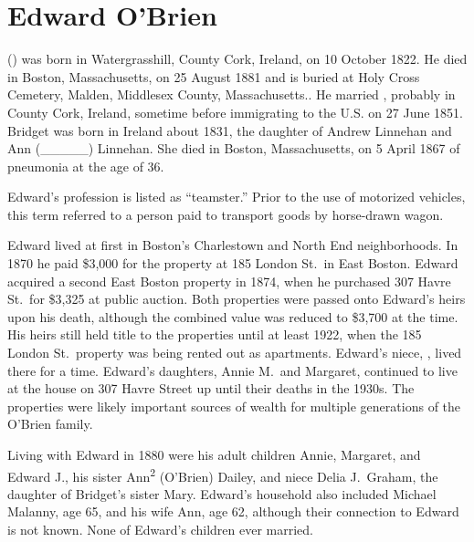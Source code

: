 \section{Edward O'Brien}

 () was born in Watergrasshill, County Cork, Ireland, on 10 October 1822.\cite{Edward2OBrienNaturalization} He died in Boston, Massachusetts, on 25 August 1881\cite{Edward2OBrienDeath} and is buried at Holy Cross Cemetery, Malden, Middlesex County, Massachusetts.\cite{CarolGordon}. He married ,\cite{Edward2OBrienMarriage} probably in County Cork, Ireland, sometime before immigrating to the U.S. on 27 June 1851.\cite{Edward2OBrienNaturalization,Edward2OBrienPetition} Bridget was born in Ireland about 1831, the daughter of Andrew Linnehan and Ann (\_\_\_\_\_) Linnehan. She died in Boston, Massachusetts, on 5 April 1867 of pneumonia at the age of 36.\cite{BridgetLinnehanDeath}

Edward's profession is listed as ``teamster.''\cite{LondonStDeed,Edward2OBrien1876} Prior to the use of motorized vehicles, this term referred to a person paid to transport goods by horse-drawn wagon.\cite{Teamster}

Edward lived at first in Boston's Charlestown\cite{MaryAnn3OBrienBirth} and North End\cite{Edward3OBrienBirth} neighborhoods. In 1870 he paid \$3,000 for the property at 185 London St.\ in East Boston.\cite{LondonStDeed,LondonStMap} Edward acquired a second East Boston property in 1874, when he purchased 307 Havre St.\ for \$3,325 at public auction.\cite{HavrePurchase,HavreMap} Both properties were passed onto Edward's heirs upon his death, although the combined value was reduced to \$3,700 at the time.\cite{Edward2OBrienProbate} His heirs still held title to the properties until at least 1922,\cite{Bromley1922} when the 185 London St.\ property was being rented out as apartments.\cite{GlobeRobbery} Edward's niece, , lived there for a time.\cite{Frances3OBrien1914} Edward's daughters, Annie M.\ and Margaret, continued to live at the house on 307 Havre Street up until their deaths in the 1930s.\cite{AnnMaria3OBrienDeath,Margaret3OBrienDeath} The properties were likely important sources of wealth for multiple generations of the O'Brien family.

Living with Edward in 1880 were his adult children Annie, Margaret, and Edward J., his sister Ann\textsuperscript{2} (O'Brien) Dailey, and niece Delia J.\ Graham, the daughter of Bridget's sister Mary. Edward's household also included Michael Malanny, age 65, and his wife Ann, age 62, although their connection to Edward is not known.\cite{Census1880Edward} None of Edward's children ever married. 

